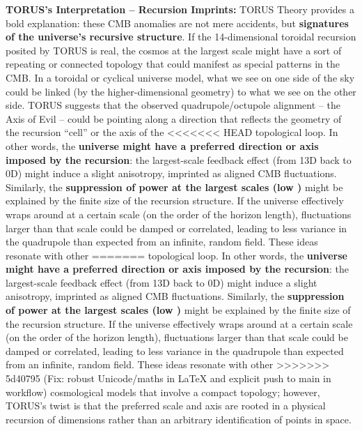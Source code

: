 \documentclass[]{article}
\begin{document}
\textbf{TORUS's Interpretation -- Recursion Imprints:} TORUS Theory
provides a bold explanation: these CMB anomalies are not mere accidents,
but \textbf{signatures of the universe's recursive structure}. If the
14-dimensional toroidal recursion posited by TORUS is real, the cosmos
at the largest scale might have a sort of repeating or connected
topology that could manifest as special patterns in the CMB. In a
toroidal or cyclical universe model, what we see on one side of the sky
could be linked (by the higher-dimensional geometry) to what we see on
the other side. TORUS suggests that the observed quadrupole/octupole
alignment -- the Axis of Evil -- could be pointing along a direction
that reflects the geometry of the recursion ``cell'' or the axis of the
<<<<<<< HEAD
topological loop\hspace{0pt}. In other words, the \textbf{universe might
have a preferred direction or axis imposed by the recursion}: the
largest-scale feedback effect (from 13D back to 0D) might induce a
slight anisotropy, imprinted as aligned CMB fluctuations\hspace{0pt}.
Similarly, the \textbf{suppression of power at the largest scales (low
\ell)} might be explained by the finite size of the recursion structure. If
the universe effectively wraps around at a certain scale (on the order
of the horizon length), fluctuations larger than that scale could be
damped or correlated, leading to less variance in the quadrupole than
expected from an infinite, random field. These ideas resonate with other
=======
topological loop​. In other words, the \textbf{universe might have a
preferred direction or axis imposed by the recursion}: the largest-scale
feedback effect (from 13D back to 0D) might induce a slight anisotropy,
imprinted as aligned CMB fluctuations​. Similarly, the
\textbf{suppression of power at the largest scales (low \ell)} might be
explained by the finite size of the recursion structure. If the universe
effectively wraps around at a certain scale (on the order of the horizon
length), fluctuations larger than that scale could be damped or
correlated, leading to less variance in the quadrupole than expected
from an infinite, random field. These ideas resonate with other
>>>>>>> 5d40795 (Fix: robust Unicode/maths in LaTeX and explicit push to main in workflow)
cosmological models that involve a compact topology; however, TORUS's
twist is that the preferred scale and axis are rooted in a physical
recursion of dimensions rather than an arbitrary identification of
points in space.
\end{document}
